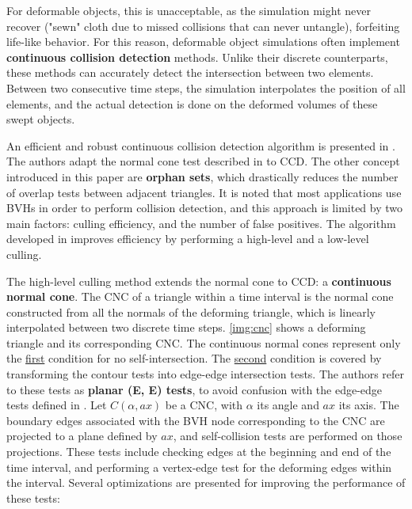 For deformable objects, this is unacceptable, as the simulation might never recover ("sewn" cloth due to missed collisions that can never untangle), forfeiting life-like behavior. For this reason, deformable object simulations often implement \textbf{continuous collision detection} methods. Unlike their discrete counterparts, these methods can accurately detect the intersection between two elements. Between two consecutive time steps, the simulation interpolates the position of all elements, and the actual detection is done on the deformed volumes of these swept objects.

An efficient and robust continuous collision detection algorithm is presented in \citep{tang08}. The authors adapt the normal cone test described in \citep{provot97} to CCD. The other concept introduced in this paper are \textbf{orphan sets}, which drastically reduces the number of overlap tests between adjacent triangles. It is noted that most applications use BVHs in order to perform collision detection, and this approach is limited by two main factors: culling efficiency, and the number of false positives. The algorithm developed in \citep{tang08} improves efficiency by performing a high-level and a low-level culling.


The high-level culling method extends the normal cone to CCD: a \textbf{continuous normal cone}. The CNC of a triangle within a time interval is the normal cone constructed from all the normals of the deforming triangle, which is linearly interpolated between two discrete time steps. \autoref{img:cnc} shows a deforming triangle and its corresponding CNC. The continuous normal cones represent only the \hyperref[prop:sc1]{first} condition for no self-intersection. The \hyperref[prop:sc2]{second} condition is covered by transforming the contour tests into edge-edge intersection tests. The authors refer to these tests as \textbf{planar (E, E) tests}, to avoid confusion with the edge-edge tests defined in \citep{provot97}. Let $C(\alpha, ax)$ be a CNC, with $\alpha$ its angle and $ax$ its axis. The boundary edges associated with the BVH node corresponding to the CNC are projected to a plane defined by $ax$, and self-collision tests are performed on those projections. These tests include checking edges at the beginning and end of the time interval, and performing a vertex-edge test for the deforming edges within the interval. Several optimizations are presented for improving the performance of these tests:

